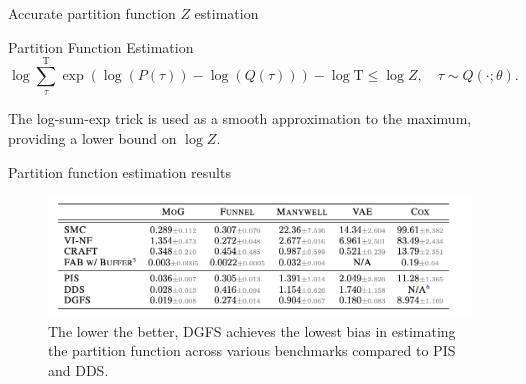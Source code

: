 \documentclass[aspectratio=169,xcolor=dvipsnames]{beamer}
\begin{document}
\begin{frame}[t]{Accurate partition function $Z$ estimation}
\footnotesize

\vspace{1.2cm}

\begin{block}{Partition Function Estimation}
\[
\log \sum_{\tau}^\mathrm{T} \exp(\log(P(\tau)) - \log(Q(\tau))) - \log \mathrm{T} \leq \log Z, \quad \tau \sim Q(\cdot; \theta).
\]

The log-sum-exp trick is used as a smooth approximation to the maximum, providing a lower bound on $\log Z$. 

\end{block}



\end{frame}

\begin{frame}[t]{Partition function estimation results}
\footnotesize

\begin{figure}
    \centering
    \includegraphics[width=1.025\textwidth]{figures/partition_fnct.png}
    \caption{The lower the better, DGFS achieves the lowest bias in estimating the partition function across various benchmarks compared to PIS and DDS.}
\end{figure}

\end{frame}


\end{document}
